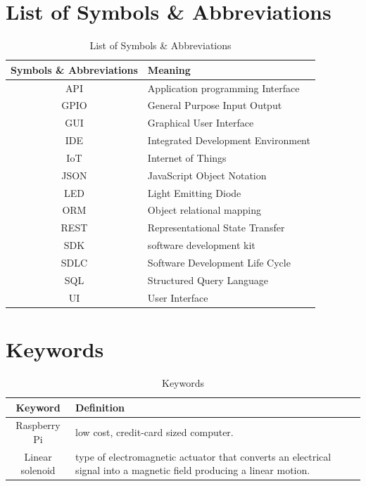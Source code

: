 \documentclass[12pt, oneside, a4paper]{book}
\newcommand\boldcolor[1]{\textcolor{bold}{\textbf{#1}}}
\begin{document}
	\chapter*{List of Symbols \& Abbreviations}
	\label{sec:sym}
	\def\arraystretch{1.5}
	\begin{table}[H]
		\begin{center}
			\begin{tabularx}{\linewidth}{|c|X|}\hline
				
				\boldcolor{Symbols \& Abbreviations} & \boldcolor{Meaning} \\\hline
				API & Application programming Interface\\\hline
				GPIO & General Purpose Input Output\\\hline
				GUI & Graphical User Interface\\\hline
				IDE & Integrated Development Environment \\\hline
				IoT & Internet of Things \\\hline
				JSON & JavaScript Object Notation\\\hline
				LED & Light Emitting Diode\\\hline
				ORM & Object relational mapping\\\hline
				REST & Representational State Transfer\\\hline
				SDK & software development kit \\\hline
				SDLC & Software Development Life Cycle\\\hline
				SQL & Structured Query Language\\\hline
				UI & User Interface\\\hline
			\end{tabularx}
		\end{center}
		\caption{List of Symbols \& Abbreviations}
	\end{table}
	\newpage
	\chapter*{Keywords}
	\label{sec:kw}
	\def\arraystretch{1.5}
	\begin{table}[H]
		\begin{center}
			\begin{tabularx}{\linewidth}{|c|X|}\hline		
				\boldcolor{Keyword} & \boldcolor{Definition} \\\hline
				Raspberry Pi & low cost, credit-card sized computer\cite{raspberry}. \\\hline
				Linear solenoid &  type of electromagnetic actuator that converts an electrical signal into a magnetic field producing a linear motion\cite{linear}.\\\hline				
			\end{tabularx}
		\end{center}
		\caption{Keywords}
	\end{table}
	\newpage
\end{document}
